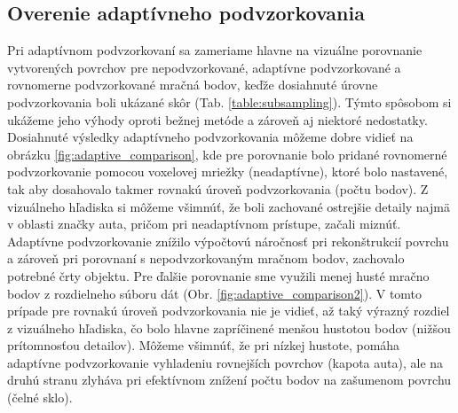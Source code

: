 \subsection{Overenie adaptívneho podvzorkovania}
\noindent Pri adaptívnom podvzorkovaní sa zameriame hlavne na vizuálne porovnanie vytvorených povrchov pre nepodvzorkované, adaptívne podvzorkované a rovnomerne podvzorkované mračná bodov, keďže dosiahnuté úrovne podvzorkovania boli ukázané skôr (Tab. \ref{table:subsampling}). Týmto spôsobom si ukážeme jeho výhody oproti bežnej metóde a zároveň aj niektoré nedostatky.
\newline\indent Dosiahnuté výsledky adaptívneho podvzorkovania môžeme dobre vidieť na obrázku \ref{fig:adaptive_comparison}, kde pre porovnanie bolo pridané rovnomerné podvzorkovanie pomocou voxelovej mriežky (neadaptívne), ktoré bolo nastavené, tak aby dosahovalo takmer rovnakú úroveň podvzorkovania (počtu bodov). Z vizuálneho hľadiska si môžeme všimnúť, že boli zachované ostrejšie detaily najmä v oblasti značky auta, pričom pri neadaptívnom prístupe, začali miznúť. Adaptívne podvzorkovanie znížilo výpočtovú náročnosť pri rekonštrukcií povrchu a zároveň pri porovnaní s nepodvzorkovaným mračnom bodov, zachovalo potrebné črty objektu.
\newline\indent Pre ďalšie porovnanie sme využili menej husté mračno bodov z rozdielneho súboru dát (Obr. \ref{fig:adaptive_comparison2}). V tomto prípade pre rovnakú úroveň podvzorkovania nie je vidieť, až taký výrazný rozdiel z vizuálneho hľadiska, čo bolo hlavne zapríčinené menšou hustotou bodov (nižšou prítomnosťou detailov). Môžeme všimnúť, že pri nízkej hustote, pomáha adaptívne podvzorkovanie vyhladeniu rovnejších povrchov (kapota auta), ale na druhú stranu zlyháva pri efektívnom znížení počtu bodov na zašumenom povrchu (čelné sklo).


